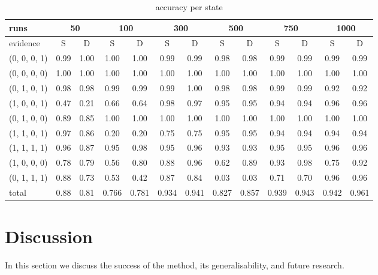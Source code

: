 \documentclass[12pt]{article}
\begin{document}
\begin{table}[htbp]
\small
\centering
\begin{tabular}{|l|c|c|c|c|c|c|c|c|c|c|c|c|}
\hline
	runs				&	\multicolumn{2}{|c|}{50}  &	\multicolumn{2}{|c|}{100}	&	\multicolumn{2}{|c|}{300} &	\multicolumn{2}{|c|}{500}	&	\multicolumn{2}{|c|}{750}&	\multicolumn{2}{|c|}{1000}	\\
\hline
	evidence						&	S	&	D	&	S	&	D	&	S	&	D	&	S	&	D	&	S	&	D	&	S	&	D	\\
\hline
(0, 	0, 	0, 	1) 				& 	0.99 & 1.00&	1.00 & 1.00	&	0.99 & 0.99	& 	0.98 & 0.98	& 	0.99 & 0.99	& 	0.99 & 0.99	\\
(0, 	0, 	0, 	0) 				& 	1.00 & 1.00&	1.00 & 1.00	&	1.00 & 1.00	& 	1.00 & 1.00	& 	1.00 & 1.00	& 	1.00 & 1.00	\\
(0, 	1, 	0, 	1) 				& 	0.98 & 0.98&	0.99 & 0.99	&	0.99 & 1.00	& 	0.98 & 0.98	& 	0.99 & 0.99	& 	0.92 & 0.92	\\
(1, 	0, 	0, 	1) 				& 	0.47 & 0.21&	0.66 & 0.64	&	0.98 & 0.97	& 	0.95 & 0.95	& 	0.94 & 0.94	& 	0.96 & 0.96	\\
(0, 	1, 	0, 	0) 				& 	0.89 & 0.85&	1.00 & 1.00	&	1.00 & 1.00	& 	1.00 & 1.00	& 	1.00 & 1.00	& 	1.00 & 1.00	\\
(1, 	1, 	0, 	1) 				& 	0.97 & 0.86&	0.20 & 0.20	&	0.75 & 0.75	& 	0.95 & 0.95	& 	0.94 & 0.94	& 	0.94 & 0.94	\\
(1, 	1, 	1, 	1) 				& 	0.96 & 0.87&	0.95 & 0.98	&	0.95 & 0.96	& 	0.93 & 0.93	& 	0.95 & 0.95	& 	0.96 & 0.96	\\
(1, 	0, 	0, 	0) 				& 	0.78 & 0.79&	0.56 & 0.80	&	0.88 & 0.96	& 	0.62 & 0.89	& 	0.93 & 0.98	& 	0.75 & 0.92	\\
(0, 	1, 	1, 	1) 				& 	0.88 & 0.73&	0.53 & 0.42	&	0.87 & 0.84	& 	0.03 & 0.03	& 	0.71 & 0.70	& 	0.96 & 0.96	\\
\hline
total    						& 	0.88 &  0.81 & 0.766 &  0.781 &    0.934 &  0.941   &     0.827 &  0.857 &    0.939 &  0.943 &     0.942 &  0.961 \\
\hline
\end{tabular}
\caption{ accuracy per state}
\label{eye}
\end{table}


\newpage



\section{Discussion}
In this section we discuss the success of the method, its generalisability, and future research.
\end{document}
